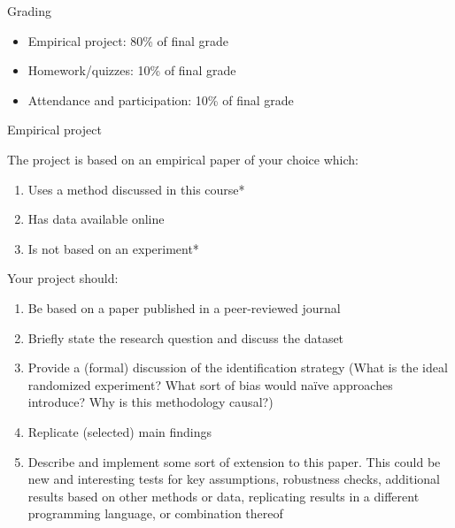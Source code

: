 \documentclass[compress, 8pt]{beamer}
\begin{document}
\begin{frame}{Grading}

\begin{itemize}
    \item Empirical project: 80\% of final grade


    \vspace{2em}
    \item Homework/quizzes: 10\% of final grade

    \vspace{2em}
    \item Attendance and participation: 10\% of final grade
\end{itemize}

\end{frame}

\begin{frame}{Empirical project}

The project is based on an empirical paper of your choice which:
\begin{enumerate}
     \item Uses a method discussed in this course*
     \item Has data available online
     \item Is not based on an experiment*
 \end{enumerate} 
 
\vspace{2ex}
Your project should:
\begin{enumerate}
    \item Be based on a paper published in a peer-reviewed journal
    \item Briefly state the research question and discuss the dataset 
    \item Provide a (formal) discussion of the identification strategy (What is the ideal randomized experiment? What sort of bias would na{\"i}ve  approaches introduce? Why is this methodology causal?)
    \item Replicate (selected) main findings
    \item Describe and implement some sort of extension to this paper. This could be new and interesting tests for key assumptions, robustness checks, additional results based on other methods or data, replicating results in a different programming language, or combination thereof
\end{enumerate}

\end{frame}
\end{document}
